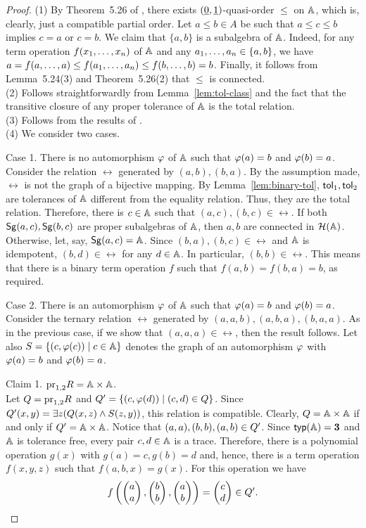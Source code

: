 \documentclass[11pt]{article}
\begin{document}
\begin{proof}
(1) By Theorem~5.26 of \cite{Hobby88:structure}, there exists
$({\underline 0},{\underline 1})$-quasi-order $\le$ on ${\mathbb A}$, which is, clearly, just a
compatible partial order. Let $a\le b\in A$ be such that $a\le c\le
b$ implies $c=a$ or $c=b$. We claim that $\{a,b\}$ is a subalgebra of
${\mathbb A}$. Indeed, for any term operation $f(x _1,\ldots, x _{n})$ of ${\mathbb A}$ and any
$a _1,\ldots, a _{n}\in\{a,b\}$, we have $a=f(a,\ldots, a)\le f(a _1,\ldots, a _{n})\le f(b,\ldots,
b)=b$. Finally, it follows from Lemma~5.24(3) and Theorem~5.26(2) that
$\le$ is connected.\\[2mm]
(2) Follows straightforwardly from Lemma~\ref{lem:tol-class} and the
fact that the transitive closure of any proper tolerance of ${\mathbb A}$ is
the total relation.\\[2mm]
(3) Follows from the results of \cite{Kearnes96:idempotent}.\\[2mm]
(4) We consider two cases.
\medskip

\noindent
{\sc Case 1.} There is no automorphism $\varphi$ of ${\mathbb A}$ such that
$\varphi(a)=b$ and $\varphi(b)=a$.\\[2mm]
Consider the relation $\rel$ generated by $(a,b),(b,a)$. By the
assumption made, $\rel$ is not the graph of a bijective mapping. By
Lemma~\ref{lem:binary-tol}, ${\sf tol}_1,{\sf tol}_2$ are tolerances of ${\mathbb A}$
different from the equality relation. Thus, they are the total
relation. Therefore, there is $c\in{\mathbb A}$ such that
$(a,c),(b,c)\in\rel$. If both ${\sf Sg}(a,c),{\sf Sg}(b,c)$ are proper
subalgebras of ${\mathbb A}$, then $a,b$ are connected in
${\mathcal H}({\mathbb A})$. Otherwise, let, say, ${\sf Sg}(a,c)={\mathbb A}$. Since
$(b,a),(b,c)\in\rel$ and ${\mathbb A}$ is idempotent, $(b,d)\in\rel$ for any
$d\in {\mathbb A}$. In particular, $(b,b)\in\rel$. This means that there is a
binary term operation $f$ such that $f(a,b)=f(b,a)=b$, as required.
\medskip

\noindent
{\sc Case 2.} There is an automorphism $\varphi$ of ${\mathbb A}$ such that
$\varphi(a)=b$ and $\varphi(b)=a$.\\[2mm]
Consider the ternary relation $\rel$ generated by
$(a,a,b),(a,b,a),(b,a,a)$. As in the previous case, if we show that
$(a,a,a)\in\rel$, then the result follows. Let also
$S=\{(c,\varphi(c))\mid c\in {\mathbb A}\}$ denotes the graph of an automorphism
$\varphi$ with $\varphi(a)=b$ and $\varphi(b)=a$. 
\medskip

\noindent
{\sc Claim 1.} ${\rm pr}_{1,2}R={\mathbb A}\times{\mathbb A}$.\\[2mm]
Let $Q={\rm pr}_{1,2}R$ and $Q'=\{(c,\varphi(d))\mid
(c,d)\in Q\}$. Since $Q'(x,y)=\exists z (Q(x,z)\wedge S(z,y))$, this
relation is compatible. Clearly, $Q={\mathbb A}\times{\mathbb A}$ if and only if
$Q'={\mathbb A}\times{\mathbb A}$. Notice that $(a,a),(b,b),(a,b)\in Q'$. Since
${\sf typ}({\mathbb A})={\bf3}$ and ${\mathbb A}$ is tolerance free, every pair $c,d\in{\mathbb A}$
is a trace. Therefore, there is a polynomial operation $g(x)$ with
$g(a)=c, g(b)=d$ and, hence, there is a term operation $f(x,y,z)$ such
that $f(a,b,x)=g(x)$. For this operation we have
$$
f\left(\cl aa,\cl bb,\cl ab\right)=\cl cd\in\relo'.
$$
\medskip


\end{proof}
\end{document}
